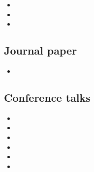 \documentclass{scrartcl}
\begin{document}
\begin{itemize}
  \item {}
  \item {}
  \item {}
\end{itemize}

\subsection*{Journal paper}

\begin{itemize}
  \item {}
\end{itemize}

\subsection*{Conference talks}
\label{sec:Quelq-autr-expos}

\begin{itemize}
  \item {}
  \item {}
  \item {}
  \item {}
  \item {}
  \item {}
\end{itemize}



\end{document}
